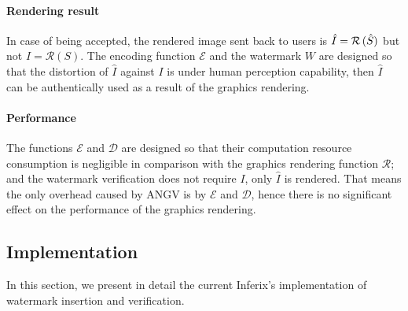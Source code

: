 \paragraph[Rendering result]{Rendering result}
In case of being accepted, the rendered image sent back to users is $\hat{I} = \mathcal{R}\thinspace(\hat{S})$ but not $I = \mathcal{R}\left(S\right)$. The encoding function $\mathcal{E}$ and the watermark $W$ are designed so that the distortion of $\hat{I}$ against $I$ is under human perception capability, then $\hat{I}$ can be authentically used as a result of the graphics rendering.

\paragraph[Performance]{Performance}
The functions $\mathcal{E}$ and $\mathcal{D}$ are designed so that their computation resource consumption is negligible in comparison with the graphics rendering function $\mathcal{R}$; and the watermark verification does not require $I$, only $\hat{I}$ is rendered. That means the only overhead caused by ANGV is by $\mathcal{E}$ and $\mathcal{D}$, hence there is no significant effect on the performance of the graphics rendering.
 

\subsection[Implementation]{Implementation}
In this section, we present in detail the current Inferix's implementation of watermark insertion and verification.


